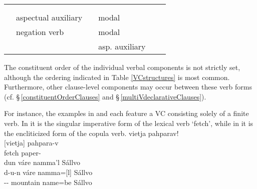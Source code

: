 \begin{table}
{\begin{tabular}{|x{.05\textwidth}|p{.25\textwidth} x{.025\textwidth}p{.295\textwidth} x{.025\textwidth}p{.275\textwidth}|}
&		& &	& & \\%
&		& &		& & \\\hline
{}&aspectual auxiliary		&\PLUS & modal\BS{}\PROGs			&\PLUS & \INFs	\\%
{}&negation verb			&\PLUS & modal\BS\CONNEGs		&\PLUS & \INFs	\\
&			&\PLUS & asp. auxiliary\BS\CONNEGs		&\PLUS & \PROGs	\\
\end{tabular}}
\end{table}

\FloatBarrier
The constituent order of the individual verbal components is not strictly set, although the ordering indicated in Table \vref{VCstructures} is most common. Furthermore, other clause-level components may occur between these verb forms (cf. §\,\ref{constituentOrderClauses} and §\,\ref{multiVdeclarativeClauses}). 

For instance, the examples in  and  each feature a VC consisting solely of a finite verb. In  it is the singular imperative form of the lexical verb  ‘fetch’, while in  it is the encliticized  form of the copula verb. %
\ea\label{VCex1}
\glll	vietja pahparav!\\
	{[vietja]\subVC} pahpara-v\\
	fetch\BS{} paper-\\\nopagebreak
{}	
\z
\ea\label{VCex2}
\glll	dun váre namma'l Sállvo\\
	d-u-n váre {namma=[l]\subVC} Sállvo\\
	-- mountain\BS{} name\BS{}=be\BS{} Sállvo\BS{}\\\nopagebreak
{}	
\z

